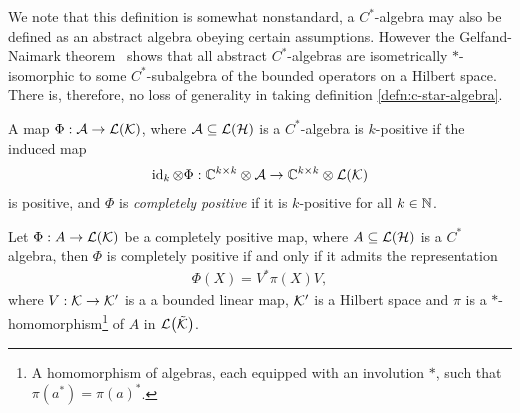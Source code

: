 We note that this definition is somewhat nonstandard, a  $C^*$-algebra may also be defined as an abstract algebra obeying certain assumptions. However the Gelfand-Naimark theorem~\cite{gelfand-naimark-1943} shows that all abstract $C^*$-algebras are isometrically $*$-isomorphic to some $C^*$-subalgebra of the bounded operators on a Hilbert space. There is, therefore, no loss of generality in taking definition \ref{defn:c-star-algebra}.


\begin{defn}\label{defn:completely-positive-map}
  A map $\Phi:\acal\to \bops[\kcal]$, where $\acal\subseteq \bops[\hcal]$ is a $C^*$-algebra is $k$-positive if the induced map
  \begin{align}
    \operatorname{id}_k\otimes \Phi:\Cx^{k\times k}\otimes \acal\to \Cx^{k\times k}\otimes\bops[\kcal]
  \end{align}
  is positive, and $\Phi$ is \emph{completely positive} if it is $k$-positive for all $k\in\mathbb{N}$.
\end{defn}

\begin{thm}[Stinespring]\label{thm:stinespring}
  Let $\Phi:A\to\bops[\kcal]$ be a completely positive map, where $A\subseteq\bops[\hcal]$ is a $C^*$ algebra, then $\Phi$ is completely positive if and only if it admits the representation
  \begin{align}
    \Phi(X) = V^* \pi(X) V,
  \end{align}
  where $V:\mathcal{K}\to\mathcal{K}^\prime$ is a a bounded linear map, $\mathcal{K}^\prime$ is a Hilbert space and $\pi$ is a $*$-homomorphism\footnote{A homomorphism of algebras, each equipped with an involution $*$, such that $\pi(a^*)=\pi(a)^*$.} of $A$ in $\bops[\tilde{\kcal}]$.
\end{thm}


